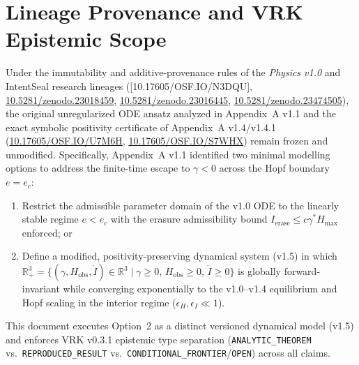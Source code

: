 \documentclass[11pt,a4paper]{article}
\theoremstyle{remark}
\begin{document}
\begin{abstract}
$|\Delta l_1|$ decay from $2.21 \times 10^{-8}$ and $1.75 \times 10^{-6}$ at $\epsilon = 0.10$, to $1.48 \times 10^{-86}$ and $1.11 \times 10^{-82}$ at $\epsilon = 0.01$ ($\operatorname{sech}^2(H_{\text{obs}}^*/\epsilon_H) = 5.38 \times 10^{-695}$), and $2.05 \times 10^{-173}$ and $6.11 \times 10^{-169}$ at $\epsilon = 0.005$. Lean~4 machine-checks the six boundary inequalities and auxiliary bounds; the analytic application of Nagumo's theorem and the ODE-flow conclusion are not formalized in Lean. Symbolic equilibria and Taylor tensors are checked by \texttt{SymPy}; the $\epsilon$-scaling sweep uses 60/750/1450-digit \texttt{mpmath}; Liouville and Floquet outputs are numerical diagnostics. Transverse multipliers and finite-difference values are unresolved at the reported scale and are not stability bounds.
\end{abstract}

\section{Lineage Provenance and VRK Epistemic Scope}

Under the immutability and additive-provenance rules of the \textit{Physics v1.0} and IntentSeal research lineages ([10.17605/OSF.IO/N3DQU], \href{https://doi.org/10.5281/zenodo.23018459}{10.5281/zenodo.23018459}, \href{https://doi.org/10.5281/zenodo.23016445}{10.5281/zenodo.23016445}, \href{https://doi.org/10.5281/zenodo.23474505}{10.5281/zenodo.23474505}), the original unregularized ODE ansatz analyzed in Appendix~A v1.1 and the exact symbolic positivity certificate of Appendix~A v1.4/v1.4.1 (\href{https://doi.org/10.17605/OSF.IO/U7M6H}{10.17605/OSF.IO/U7M6H}, \href{https://doi.org/10.17605/OSF.IO/S7WHX}{10.17605/OSF.IO/S7WHX}) remain frozen and unmodified. Specifically, Appendix~A v1.1 identified two minimal modelling options to address the finite-time escape to $\gamma < 0$ across the Hopf boundary $e = e_c$:
\begin{enumerate}
\setlength{\itemsep}{1pt}\setlength{\parskip}{0pt}
    \item Restrict the admissible parameter domain of the v1.0 ODE to the linearly stable regime $e < e_c$ with the erasure admissibility bound $\dot{I}_{\text{erase}} \le c\gamma^* H_{\max}$ enforced; or
    \item Define a modified, positivity-preserving dynamical system (v1.5) in which $\mathbb{R}^3_+ = \{(\gamma, H_{\text{obs}}, \dot{I}) \in \mathbb{R}^3 \mid \gamma \ge 0,\, H_{\text{obs}} \ge 0,\, \dot{I} \ge 0\}$ is globally forward-invariant while converging exponentially to the v1.0--v1.4 equilibrium and Hopf scaling in the interior regime ($\epsilon_H, \epsilon_I \ll 1$).
\end{enumerate}
This document executes Option~2 as a distinct versioned dynamical model (v1.5) and enforces VRK v0.3.1 epistemic type separation (\texttt{ANALYTIC\_THEOREM} vs.\ \texttt{REPRODUCED\_RESULT} vs.\ \texttt{CONDITIONAL\_FRONTIER}/\texttt{OPEN}) across all claims.
\end{document}
